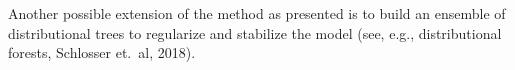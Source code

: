 \documentclass[twoside]{report}
\begin{document}

Another possible extension of the method as presented is to build an ensemble of 
distributional trees to regularize and stabilize the model 
(see, e.g., distributional forests, Schlosser et.~al, 2018). 



\bigskip




\end{document}
